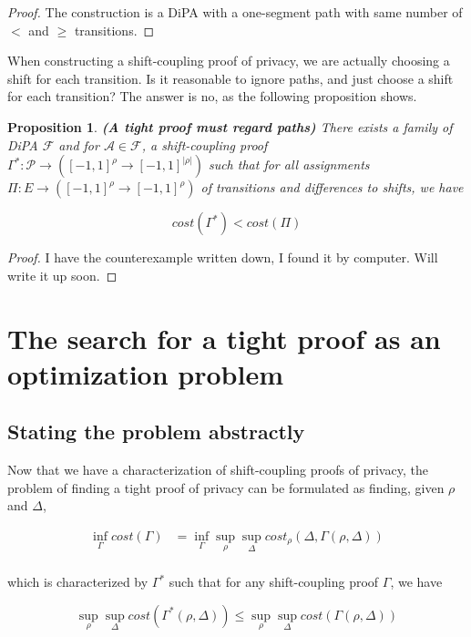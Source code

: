 \documentclass{article}
\newtheorem{proposition}{Proposition}[section]
\newcommand{\1}{\langle 1 \rangle}
\newcommand{\2}{\langle 2 \rangle}
\begin{document}
\begin{proof}
    The construction is a DiPA with a one-segment path with same number of $<$ and $\geq$ transitions.
\end{proof}

When constructing a shift-coupling proof of privacy, we are actually choosing a shift for each transition. Is it reasonable to ignore paths, and just choose a shift for each transition? The answer is no, as the following proposition shows.

\begin{proposition}
    \label{prop:proofs_must_regard_paths}
    \textbf{(A tight proof must regard paths)} There exists a family of DiPA $\mathcal{F}$ and for $\mathcal{A} \in \mathcal{F}$, a shift-coupling proof $\Gamma^*: \mathcal{P} \to ([-1, 1]^{\rho} \to [-1, 1]^{|\rho|})$ such that for all assignments $\Pi: E \to ([-1, 1]^{\rho} \to [-1, 1]^{\rho})$ of transitions and differences to shifts, we have

    \[cost(\Gamma^*) < cost(\Pi)\]
\end{proposition}

\begin{proof}
    I have the counterexample written down, I found it by computer. Will write it up soon.
\end{proof}

\section{The search for a tight proof as an optimization problem}

\subsection{Stating the problem abstractly}

Now that we have a characterization of shift-coupling proofs of privacy, the problem of finding a tight proof of privacy can be formulated as finding, given $\rho$ and $\Delta$,

\begin{align*}
    \inf_{\Gamma} cost(\Gamma) &= \inf_{\Gamma} \sup_{\rho} \sup_{\Delta} cost_{\rho}(\Delta, \Gamma(\rho, \Delta)) \\
\end{align*}

which is characterized by $\Gamma^*$ such that for any shift-coupling proof $\Gamma$, we have

\[\sup_{\rho} \sup_{\Delta} cost(\Gamma^*(\rho, \Delta)) \leq \sup_{\rho} \sup_{\Delta} cost(\Gamma(\rho, \Delta))\]
\end{document}
